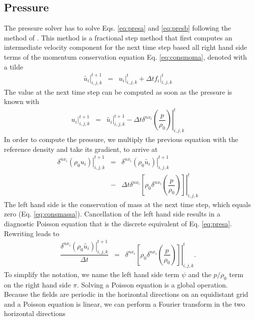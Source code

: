 \documentclass[gmd]{copernicus}
\begin{document}
\subsection{Pressure}
The pressure solver has to solve Eqs. \ref{eq:presa} and \ref{eq:presb} following the method of \citet{Chorin1968}. This method is a fractional step method that first computes an intermediate velocity component for the next time step based all right hand side terms of the momentum conservation equation Eq. \ref{eq:consmoma}, denoted with a tilde
\begin{eqnarray}
\left. \widetilde{u_i} \right|^{t+1}_{i,j,k} & = & \left. u_i \right|^{t}_{i,j,k} + \Delta t \left. f_i \right|^{t}_{i,j,k}
\end{eqnarray}
The value at the next time step can be computed as soon as the pressure is known with
\begin{eqnarray}
\left. u_i\right|^{t+1}_{i,j,k} & = & \left. \widetilde{u_i} \right|^{t+1}_{i,j,k} - \Delta t \left. \delta^{nx_i}\left( \dfrac{p}{\rho_0}\right)\right|^t_{i,j,k}
\end{eqnarray}
In order to compute the pressure, we multiply the previous equation with the reference density and take its gradient, to arrive at
\begin{eqnarray}
\nonumber \left. \delta^{nx_i} \left( \rho_0 u_i\right) \right|^{t+1}_{i,j,k} & = & 
\left. \delta^{nx_i} \left( \rho_0 \widetilde{u_i} \right) \right|^{t+1}_{i,j,k}\\
& - &  \Delta t \left.\delta^{nx_i} \left[ \rho_0 \delta^{nx_i}\left( \dfrac{p}{\rho_0}\right) \right] \right|^t_{i,j,k}
\end{eqnarray}
The left hand side is the conservation of mass at the next time step, which equals zero (Eq. \ref{eq:consmassa}). Cancellation of the left hand side results in a diagnostic Poisson equation that is the discrete equivalent of Eq. \ref{eq:presa}. Rewriting leads to
\begin{eqnarray}
\dfrac{\left. \delta^{nx_i} \left( \rho_0 \widetilde{u_i} \right) \right|^{t+1}_{i,j,k}}{\Delta t}
& = &  \left. \delta^{nx_i} \left[ \rho_0 \delta^{nx_i}\left( \dfrac{p}{\rho_0}\right) \right] \right|^t_{i,j,k}.
\end{eqnarray}
To simplify the notation, we name the left hand side term $\psi$ and the $p / \rho_0$ term on the right hand side $\pi$. Solving a Poisson equation is a global operation. Because the fields are periodic in the horizontal directions on an equidistant grid and a Poisson equation is linear, we can perform a Fourier transform in the two horizontal directions
\end{document}
